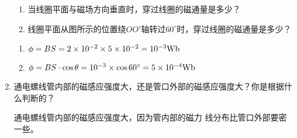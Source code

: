 \begin{enumerate}
\begin{figure}[htp]
\begin{tikzpicture}[>=latex]
	\end{tikzpicture}
	\caption{}
\end{figure}
     \begin{enumerate}
        \item 当线圈平面与磁场方向垂直时，穿过线圈的磁通量是多少？
        \item 线圈平面从图所示的位置绕$OO'$轴转过$60^\circ$时，穿过线圈的磁通量是多少？
    \end{enumerate}

   \begin{solution}
 \begin{enumerate}
     \item $\phi=BS=2\x 10^{-2}\x 5\x 10^{-2}=10^{-3}{\rm Wb}$
     \item $\phi=BS\cdot \cos\theta=10^{-3}\x \cos60^{\circ}=5\x 10^{-4}{\rm Wb}$
 \end{enumerate}
    
    \end{solution}
    
    \item 通电螺线管内部的磁感应强度大，还是管口外部的磁感应强度大？你是根据什么判断的？


    \begin{solution}
        通电螺线管内部的磁感应强度大，因为管内部的磁力
        线分布比管口外部要密一些。
    \end{solution}
    
\end{enumerate}



